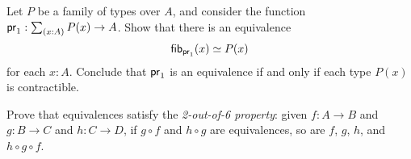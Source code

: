\begin{ex}\label{ex:projoftotaloffamcontrisequiv}
  Let $P$ be a family of types over $A$, and consider the function
  $\proj{1}:\sm{x:A}P(x)\to A$. Show that there is an equivalence
  \begin{equation*}
    {\mathsf{fib}}_{\mathsf{pr}_{1}}(x) \simeq P(x)
  \end{equation*}
  for each $x:A$.
  Conclude that $\mathsf{pr}_{1}$ is an equivalence if and only if each type $P(x)$ is contractible.
\end{ex}

\begin{ex}
  Prove that equivalences satisfy the \emph{2-out-of-6 property}: given $f:A\to B$ and $g:B\to C$ and $h:C\to D$, if $g\circ f$ and $h\circ g$ are equivalences, so are $f$, $g$, $h$, and $h\circ g\circ f$.
\end{ex}

